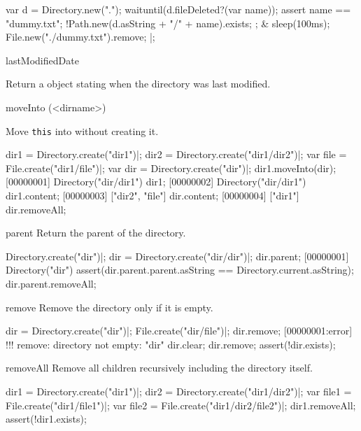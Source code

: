\begin{urbiscriptapi}
\begin{urbiscript}
  {
    var d = Directory.new(".");
    waituntil(d.fileDeleted?(var name));
    assert
    {
      name == "dummy.txt";
      !Path.new(d.asString + "/" + name).exists;
    };
  }
&
  {
    sleep(100ms);
    File.new("./dummy.txt").remove;
  }|;
\end{urbiscript}


\item[lastModifiedDate]
  \experimental{}

  Return a  object stating when the directory was last modified.


\item[moveInto](<dirname>)
  \experimental{}

  Move \lstinline|this| into  without creating it.
\begin{urbiscript}
dir1 = Directory.create("dir1")|;
dir2 = Directory.create("dir1/dir2")|;
var file = File.create("dir1/file")|;
var dir = Directory.create("dir")|;
dir1.moveInto(dir);
[00000001] Directory("dir/dir1")
dir1;
[00000002] Directory("dir/dir1")
dir1.content;
[00000003] ["dir2", "file"]
dir.content;
[00000004] ["dir1"]
dir.removeAll;
\end{urbiscript}


\item[parent]
  Return the parent of the directory.
\begin{urbiscript}
Directory.create("dir")|;
dir = Directory.create("dir/dir")|;
dir.parent;
[00000001] Directory("dir")
assert(dir.parent.parent.asString == Directory.current.asString);
dir.parent.removeAll;
\end{urbiscript}


\item[remove]
  Remove the directory only if it is empty.
\begin{urbiscript}
dir = Directory.create("dir")|;
File.create("dir/file")|;
dir.remove;
[00000001:error] !!! remove: directory not empty: "dir"
dir.clear;
dir.remove;
assert(!dir.exists);
\end{urbiscript}


\item[removeAll]
  Remove all children recursively including the directory itself.
\begin{urbiscript}
dir1 = Directory.create("dir1")|;
dir2 = Directory.create("dir1/dir2")|;
var file1 = File.create("dir1/file1")|;
var file2 = File.create("dir1/dir2/file2")|;
dir1.removeAll;
assert(!dir1.exists);
\end{urbiscript}



\end{urbiscriptapi}
